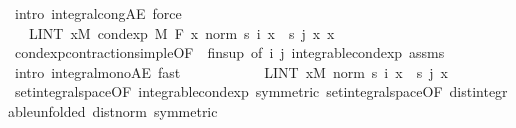 \begin{isabellebody}
\ {\isacharparenleft}{\kern0pt}intro\ integral{\isacharunderscore}{\kern0pt}cong{\isacharunderscore}{\kern0pt}AE{\isacharparenright}{\kern0pt}\ force{\isacharplus}{\kern0pt}\ \ \ \ \ \ \isanewline
\ \ \ \ \ \ \isamarkupfalse%
\ \isamarkupfalse%
\ {\isachardoublequoteopen}{\isachardot}{\kern0pt}{\isachardot}{\kern0pt}{\isachardot}{\kern0pt}\ {\isasymle}\ LINT\ x{\isacharbar}{\kern0pt}M{\isachardot}{\kern0pt}\ cond{\isacharunderscore}{\kern0pt}exp\ M\ F\ {\isacharparenleft}{\kern0pt}{\isasymlambda}x{\isachardot}{\kern0pt}\ norm\ {\isacharparenleft}{\kern0pt}s\ i\ x\ {\isacharminus}{\kern0pt}\ s\ j\ x{\isacharparenright}{\kern0pt}{\isacharparenright}{\kern0pt}\ x{\isachardoublequoteclose}\ \isamarkupfalse%
\ cond{\isacharunderscore}{\kern0pt}exp{\isacharunderscore}{\kern0pt}contraction{\isacharunderscore}{\kern0pt}simple{\isacharbrackleft}{\kern0pt}OF\ {\isacharunderscore}{\kern0pt}\ fin{\isacharunderscore}{\kern0pt}sup{\isacharcomma}{\kern0pt}\ of\ i\ j{\isacharbrackright}{\kern0pt}\ integrable{\isacharunderscore}{\kern0pt}cond{\isacharunderscore}{\kern0pt}exp\ assms{\isacharparenleft}{\kern0pt}{}{\isacharparenright}{\kern0pt}\ \isamarkupfalse%
\ {\isacharparenleft}{\kern0pt}intro\ integral{\isacharunderscore}{\kern0pt}mono{\isacharunderscore}{\kern0pt}AE{\isacharcomma}{\kern0pt}\ fast{\isacharplus}{\kern0pt}{\isacharparenright}{\kern0pt}\isanewline
\ \ \ \ \ \ \isamarkupfalse%
\ \isamarkupfalse%
\ {\isachardoublequoteopen}{\isachardot}{\kern0pt}{\isachardot}{\kern0pt}{\isachardot}{\kern0pt}\ {\isacharequal}{\kern0pt}\ LINT\ x{\isacharbar}{\kern0pt}M{\isachardot}{\kern0pt}\ norm\ {\isacharparenleft}{\kern0pt}s\ i\ x\ {\isacharminus}{\kern0pt}\ s\ j\ x{\isacharparenright}{\kern0pt}{\isachardoublequoteclose}\ \isamarkupfalse%
\ set{\isacharunderscore}{\kern0pt}integral{\isacharunderscore}{\kern0pt}space{\isacharparenleft}{\kern0pt}{}{\isacharparenright}{\kern0pt}{\isacharbrackleft}{\kern0pt}OF\ integrable{\isacharunderscore}{\kern0pt}cond{\isacharunderscore}{\kern0pt}exp{\isacharcomma}{\kern0pt}\ symmetric{\isacharbrackright}{\kern0pt}\ set{\isacharunderscore}{\kern0pt}integral{\isacharunderscore}{\kern0pt}space{\isacharbrackleft}{\kern0pt}OF\ dist{\isacharunderscore}{\kern0pt}integrable{\isacharbrackleft}{\kern0pt}unfolded\ dist{\isacharunderscore}{\kern0pt}norm{\isacharbrackright}{\kern0pt}{\isacharcomma}{\kern0pt}\ symmetric{\isacharbrackright}{\kern0pt}\ \isamarkupfalse%

\end{isabellebody}
